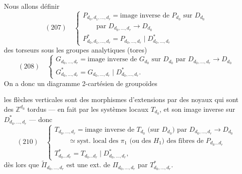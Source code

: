 \documentclass[11pt,a4paper]{article}
\begin{document}
Nous allons définir
\[
  (207) \quad
  \begin{cases}
    P_{d_0,d_1,\dots,d_r} = \text{image inverse de } P_{d_0} \text{ sur } D_{d_0} \\
    \qquad \text{par } D_{d_0,\dots,d_r} \to D_{d_0} \\
    P^{*}_{d_0,d_1,\dots,d_r} = P_{d_0,\dots,d_r} \mid D^{*}_{d_0,\dots,d_r}
  \end{cases}
\]
 des torseurs sous les groupes analytiques (tores)
\[
  (208) \quad
  \begin{cases}
    G_{d_0,\dots,d_r} = \text{image inverse de } G_{d_0} \text{ sur } D_{d_0}
    \text{ par } D_{d_0,\dots,d_r} \to D_{d_0} \\
    G^{*}_{d_0,\dots,d_r} = G_{d_0,\dots,d_r} \mid D^{*}_{d_0,\dots,d_r} .
  \end{cases}
\]
On a donc un diagramme 2-cartésien de groupoïdes



\ill{} les flèches verticales sont des morphismes d'extensions par des noyaux
qui sont des $\mathbb{Z}^{d_0}$ tordus — en fait par les systèmes locaux
$T_{d_0}$, et son image inverse sur $D^{*}_{d_0,\dots,d_r}$ — 
donc
\[
  (210) \quad
  \begin{cases}
    T_{d_0,\dots,d_r} = \text{image inverse de } T_{d_0} \text{ (sur } D_{d_0}\text{)}
    \text{ par } D_{d_0,\dots,d_r} \to D_{d_0} \\
    \qquad \simeq \text{syst. local des } \pi_1 \text{ (ou des } H_1)
    \text{ des fibres de } P_{d_0 \dots d_r} \\
    T^{*}_{d_0 \dots d_r} = T_{d_0 \dots d_r} \mid D^{*}_{d_0,\dots,d_r} ,
  \end{cases}
\]
dès lors que $\widetilde{\Pi}_{d_0,\dots,d_r}$ est une ext. de
$\Pi_{d_0,\dots,d_r}$ par $T^{*}_{d_0,\dots,d_r}$.
\end{document}
